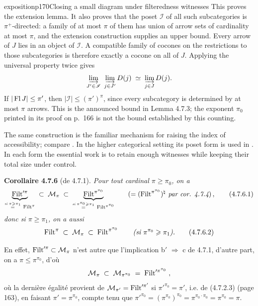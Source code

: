 \begin{dcomment}{exposition}{p170}{Closing a small diagram under filteredness witnesses}
This proves the extension lemma. It also proves that the poset $\mathscr I$ of all such subcategories is $\pi^+$-directed: a family of at most $\pi$ of them has union of arrow sets of cardinality at most $\pi$, and the extension construction supplies an upper bound. Every arrow of $J$ lies in an object of $\mathscr I$. A compatible family of cocones on the restrictions to those subcategories is therefore exactly a cocone on all of $J$. Applying the universal property twice gives
\[
 \varinjlim_{J'\in\mathscr I}\ \varinjlim_{j\in J'}D(j)
 \;\simeq\;\varinjlim_{j\in J}D(j).
\]
If $|\operatorname{Fl} J|\leq\pi'$, then $|\mathscr I|\leq(\pi')^\pi$, since every subcategory is determined by at most $\pi$ arrows. This is the announced bound in Lemma 4.7.3; the exponent $\pi_0$ printed in its proof on p.~166 is not the bound established by this counting.

The same construction is the familiar mechanism for raising the index of accessibility; compare \citet[Theorem 3.4]{Vasey2020Accessible}. In the higher categorical setting its poset form is used in \citet[Lemma 5.4.2.8 and Proposition 5.4.2.9]{Lurie2009HTT}. In each form the essential work is to retain enough witnesses while keeping their total size under control.
\end{dcomment}


\textbf{Corollaire 4.7.6} (de 4.7.1). \textit{Pour tout cardinal $\pi \geqslant \pi_0$, on a}
\[
\underbrace{\Filt'^{\pi}}_{\overset{\textit{si } \pi \geqslant \pi_1}{=}\ \Filt^{\pi}} \;\subset\; \mathcal{M}_{\pi} \;\subset\; \underbrace{\Filt^{\pi^{\pi_0}}}_{\overset{\textit{si } \pi^{\pi_0} \geqslant \pi_1}{=}\ \Filt^{\pi^{\pi_0}}} \qquad (= (\Filt^{\pi^{\pi_0}})^{\natural} \textit{ par cor. 4.7.4})\,, \tag*{(4.7.6.1)} %
\]
\textit{donc si $\pi \geqslant \pi_1$, on a aussi}
\[
\operatorname{Filt}^{\pi} \;\subset\; \mathcal{M}_{\pi} \;\subset\; \operatorname{Filt}^{\pi^{\pi_0}} \qquad \textit{(si $\pi^{\pi_0} \geqslant \pi_1$).} \tag*{(4.7.6.2)}
\]

En effet, $\operatorname{Filt}'^{\pi} \subset \mathcal{M}_{\pi}$ n’est autre que l’implication b$'$ $\Longrightarrow$ c de 4.7.1, d’autre part, on a $\pi \leqslant \pi^{\pi_0}$, d’où
\[
\mathcal{M}_{\pi} \;\subset\; \mathcal{M}_{\pi^{\pi_0}} \;=\; \operatorname{Filt}'^{\pi^{\pi_0}} \;,
\]
où la dernière égalité provient de $\mathcal{M}_{\pi'} = \operatorname{Filt}'^{\pi'}$ si $\pi'^{\pi_0} = \pi'$, i.e. de (4.7.2.3) (page 163), en faisant $\pi' = \pi^{\pi_0}$, compte tenu que $\pi'^{\pi_0} = (\pi^{\pi_0})^{\pi_0} = \pi^{\pi_0 \cdot \pi_0} = \pi^{\pi_0} = \pi$.

